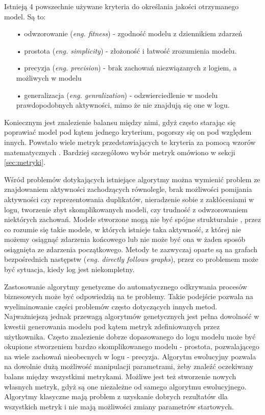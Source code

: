 Istnieją 4 powszechnie używane kryteria do określania jakości otrzymanego model. Są to:
\begin{itemize}
  \item[•] odwzorowanie (\textit{eng. fitness}) - zgodność modelu z dziennikiem zdarzeń
  \item[•] prostota (\textit{eng. simplicity}) - złożoność i łatwość zrozumienia modelu.
  \item[•] precyzja (\textit{eng. precision}) - brak zachowań niezwiązanych z logiem, a możliwych w modelu
  \item[•] generalizacja (\textit{eng. genralization}) - odzwierciedlenie w modelu prawdopodobnych aktywności, mimo że nie znajdują się one w logu.
\end{itemize}
Koniecznym jest znalezienie balansu między nimi, gdyż często starając się poprawiać model pod kątem jednego kryterium, pogorszy się on pod względem innych. Powstało wiele metryk przedstawiających te kryteria za pomocą wzorów matematycznych \cite{conf-propositions} \cite{Blum2015MetricsIP}.
Bardziej szczegółowo wybór metryk omówiono w sekcji \ref{sec:metryki}.

Wśród problemów dotykających istniejące algorytmy można wymienić problem ze znajdowaniem aktywności zachodzących równolegle, brak możliwości pomijania aktywności czy reprezentowania duplikatów, nieradzenie sobie z zakłóceniami w logu, tworzenie zbyt skomplikowanych modeli, czy trudność z odwzorowaniem niektórych zachowań. Modele stworzone mogą nie być spójne strukturalnie \cite{dongen2006b} \cite{StructuralDetectionofDeadlocks}, przez co rozumie się takie modele, w których istnieje taka aktywność, z której nie możemy osiągnąć zdarzenia końcowego lub nie może być ona w żaden sposób osiągnięta ze zdarzenia początkowego. Metody te zazwyczaj oparte są na grafach bezpośrednich następstw (\textit{eng. directly follows graphs}), przez co problemem może być sytuacja, kiedy log jest niekompletny. 

Zastosowanie algorytmy genetyczne do automatycznego odkrywania procesów biznesowych może być odpowiedzią na te problemy. Takie podejście pozwala na wyeliminowanie części problemów często dotyczących innych metod. Najważniejszą jednak przewagą algorytmów genetycznych jest pełna dowolność w kwestii generowania modelu pod kątem metryk zdefiniowanych przez użytkownika. Często znalezienie dobrze dopasowanego do logu modelu może być okupione stworzeniem bardzo skomplikowanego modelu - prostota, pozwalającego na wiele zachowań nieobecnych w logu - precyzja. Algorytm ewolucyjny pozwala na dowolnie dużą możliwość manipulacji parametrami, żeby znaleźć oczekiwany balans między wszystkimi metrykami. Możliwe jest też stworzenie nowych własnych metryk, gdyż są one niezależne od samego algorytmu ewolucyjnego. Algorytmy klasyczne mają problem z uzyskanie dobrych rezultatów dla wszystkich metryk i nie mają możliwości zmiany parametrów startowych.

